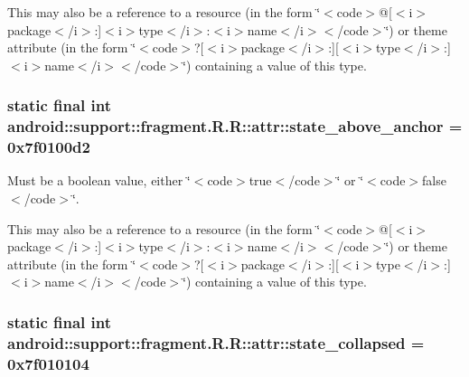 This may also be a reference to a resource (in the form \char`\"{}$<$code$>$@\mbox{[}$<$i$>$package$<$/i$>$:\mbox{]}$<$i$>$type$<$/i$>$:$<$i$>$name$<$/i$>$$<$/code$>$\char`\"{}) or theme attribute (in the form \char`\"{}$<$code$>$?\mbox{[}$<$i$>$package$<$/i$>$:\mbox{]}\mbox{[}$<$i$>$type$<$/i$>$:\mbox{]}$<$i$>$name$<$/i$>$$<$/code$>$\char`\"{}) containing a value of this type. \hypertarget{classandroid_1_1support_1_1fragment_1_1_r_1_1attr_9a734514c7dc34da7eed63dbbc38e9e4}{
\subsubsection[{state\_\-above\_\-anchor}]{\setlength{\rightskip}{0pt plus 5cm}static final int android::support::fragment.R.R::attr::state\_\-above\_\-anchor = 0x7f0100d2}}
\label{classandroid_1_1support_1_1fragment_1_1_r_1_1attr_9a734514c7dc34da7eed63dbbc38e9e4}


Must be a boolean value, either \char`\"{}$<$code$>$true$<$/code$>$\char`\"{} or \char`\"{}$<$code$>$false$<$/code$>$\char`\"{}. 

This may also be a reference to a resource (in the form \char`\"{}$<$code$>$@\mbox{[}$<$i$>$package$<$/i$>$:\mbox{]}$<$i$>$type$<$/i$>$:$<$i$>$name$<$/i$>$$<$/code$>$\char`\"{}) or theme attribute (in the form \char`\"{}$<$code$>$?\mbox{[}$<$i$>$package$<$/i$>$:\mbox{]}\mbox{[}$<$i$>$type$<$/i$>$:\mbox{]}$<$i$>$name$<$/i$>$$<$/code$>$\char`\"{}) containing a value of this type. \hypertarget{classandroid_1_1support_1_1fragment_1_1_r_1_1attr_9080c348b61589b9d3008015914b071d}{
\subsubsection[{state\_\-collapsed}]{\setlength{\rightskip}{0pt plus 5cm}static final int android::support::fragment.R.R::attr::state\_\-collapsed = 0x7f010104}}
\label{classandroid_1_1support_1_1fragment_1_1_r_1_1attr_9080c348b61589b9d3008015914b071d}


